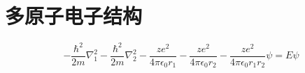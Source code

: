 \chapter{多原子电子结构}

\begin{equation*}
	-\frac{\hbar^2}{2m} \nabla_1^2 - \frac{\hbar^2}{2m} \nabla_2^2 - \frac{ze^2}{4\pi\epsilon_0r_1} - \frac{ze^2}{4\pi\epsilon_0r_2} - \frac{ze^2}{4\pi\epsilon_0r_1r_2} \psi = E\psi
\end{equation*}









